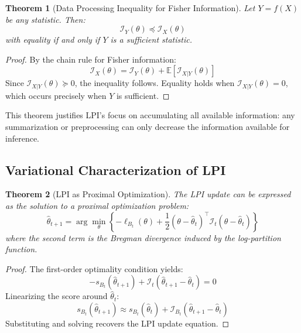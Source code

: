 \documentclass[11pt]{article}
\newtheorem{theorem}{Theorem}
\begin{document}
\begin{theorem}[Data Processing Inequality for Fisher Information]
\label{thm:data_processing}
Let $Y = f(X)$ be any statistic. Then:
\begin{equation}
\mathcal{I}_Y(\theta) \preceq \mathcal{I}_X(\theta)
\end{equation}
with equality if and only if $Y$ is a sufficient statistic.
\end{theorem}

\begin{proof}
By the chain rule for Fisher information:
\begin{equation}
\mathcal{I}_X(\theta) = \mathcal{I}_Y(\theta) + \mathbb{E}[\mathcal{I}_{X|Y}(\theta)]
\end{equation}
Since $\mathcal{I}_{X|Y}(\theta) \succeq 0$, the inequality follows. Equality holds when $\mathcal{I}_{X|Y}(\theta) = 0$, which occurs precisely when $Y$ is sufficient.
\end{proof}

This theorem justifies LPI's focus on accumulating all available information: any summarization or preprocessing can only decrease the information available for inference.

\subsection{Variational Characterization of LPI}

\begin{theorem}[LPI as Proximal Optimization]
\label{thm:proximal}
The LPI update can be expressed as the solution to a proximal optimization problem:
\begin{equation}
\hat{\theta}_{t+1} = \arg\min_{\theta} \left\{-\ell_{B_t}(\theta) + \frac{1}{2}(\theta - \hat{\theta}_t)^\top \mathcal{I}_t (\theta - \hat{\theta}_t)\right\}
\end{equation}
where the second term is the Bregman divergence induced by the log-partition function.
\end{theorem}

\begin{proof}
The first-order optimality condition yields:
\begin{equation}
-s_{B_t}(\hat{\theta}_{t+1}) + \mathcal{I}_t(\hat{\theta}_{t+1} - \hat{\theta}_t) = 0
\end{equation}
Linearizing the score around $\hat{\theta}_t$:
\begin{equation}
s_{B_t}(\hat{\theta}_{t+1}) \approx s_{B_t}(\hat{\theta}_t) + \mathcal{I}_{B_t}(\hat{\theta}_{t+1} - \hat{\theta}_t)
\end{equation}
Substituting and solving recovers the LPI update equation.
\end{proof}
\end{document}
